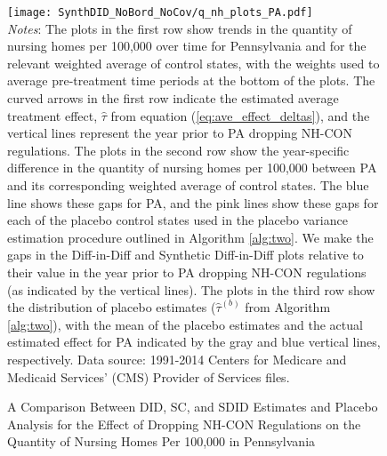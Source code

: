 \documentclass[../Main.tex]{subfiles}
\begin{document}
\newpage
{}
\begin{figure}[t] 
    \setlength{}
	\caption{\label{fig:q_nh_plots_pa} \centering A Comparison Between DID, SC, and SDID Estimates and Placebo Analysis for the Effect of Dropping NH-CON Regulations on the Quantity of Nursing Homes Per 100,000 in Pennsylvania} {\centering\texttt{[image: SynthDID\_NoBord\_NoCov/q\_nh\_plots\_PA.pdf]}}
    \vspace{-1.4cm}\\
    \scriptsize
		\textit{Notes}: The plots in the first row show trends in the quantity of nursing homes per 100,000 over time for Pennsylvania and for the relevant weighted average of control states, with the weights used to average pre-treatment time periods at the bottom of the plots. The curved arrows in the first row indicate the estimated average treatment effect, $\hat{\tau}$ from equation (\ref{eq:ave_effect_deltas}), and the vertical lines represent the year prior to PA dropping NH-CON regulations. The plots in the second row show the year-specific difference in the quantity of nursing homes per 100,000 between PA and its corresponding weighted average of control states. The blue line shows these gaps for PA, and the pink lines show these gaps for each of the placebo control states used in the placebo variance estimation procedure outlined in Algorithm \ref{alg:two}. We make the gaps in the Diff-in-Diff and Synthetic Diff-in-Diff plots relative to their value in the year prior to PA dropping NH-CON regulations (as indicated by the vertical lines). The plots in the third row show the distribution of placebo estimates ($\hat{\tau}^{(b)}$ from Algorithm \ref{alg:two}), with the mean of the placebo estimates and the actual estimated effect for PA indicated by the gray and blue vertical lines, respectively. Data source: 1991-2014 Centers for Medicare and Medicaid Services’ (CMS) Provider of Services files.
\end{figure}
\restoregeometry
\clearpage
\end{document}
